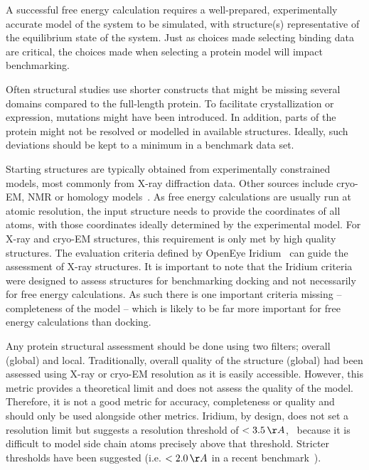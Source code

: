 \documentclass[9pt,bestpractices]{livecoms}
\begin{document}
A successful free energy calculation requires a well-prepared, experimentally accurate model of the system to be simulated, with structure(s) representative of the equilibrium state of the system. 
Just as choices made selecting binding data are critical, the choices made when selecting a protein model will impact benchmarking.

Often structural studies use shorter constructs that might be missing several domains compared to the full-length protein. To facilitate crystallization or expression, mutations might have been introduced. In addition, parts of the protein might not be resolved or modelled in available structures. Ideally, such deviations should be kept to a minimum in a benchmark data set.
%

Starting structures are typically obtained from experimentally constrained models, most commonly from X-ray diffraction data.
Other sources include cryo-EM, NMR or homology models~\cite{courniaRelativeBindingFree2017,courniaRigorousFreeEnergy2020,schindler_largescale_2020}.
As free energy calculations are usually run at atomic resolution, the input structure needs to provide the coordinates of all atoms, with those coordinates ideally determined by the experimental model.
%
For X-ray and cryo-EM structures, this requirement is only met by high quality structures.
The evaluation criteria defined by OpenEye Iridium~\cite{warrenEssentialConsiderationsUsing2012} can guide the assessment of X-ray structures. It is important to note that the Iridium criteria were designed to assess structures for benchmarking docking and not necessarily for free energy calculations. As such there is one important criteria missing -- completeness of the model -- which is likely to be far more important for free energy calculations than docking.


Any protein structural assessment should be done using two filters; overall (global) and local. Traditionally, overall quality of the structure (global) had been assessed using X-ray or cryo-EM resolution as it is easily accessible.
%
However, this metric provides a theoretical limit and does not assess the quality of the model. Therefore, it is not a good metric for accuracy, completeness or quality and should only be used alongside other metrics. Iridium, by design, does not set a resolution limit but suggests a resolution threshold of $< 3.5\,\AA$,~\cite{warrenEssentialConsiderationsUsing2012} because it is difficult to model side chain atoms precisely above that threshold. Stricter thresholds have been suggested (i.e. $<2.0\,\AA$  in a recent benchmark~\cite{schindler_largescale_2020}).
\end{document}
